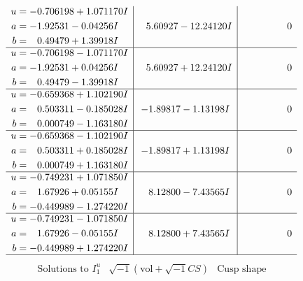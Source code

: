 \documentclass[1p]{elsarticle_modified}
\theoremstyle{definition}
\newcommand{\I}{\sqrt{-1}}
\begin{document}
$$\begin{array}{c|c|c}
\begin{aligned}
u &= -0.706198 + 1.071170 I \\
a &= -1.92531 - 0.04256 I \\
b &= \phantom{-}0.49479 + 1.39918 I\end{aligned}
 & \phantom{-}5.60927 - 12.24120 I & \phantom{-0.000000 } 0 \\ \hline\begin{aligned}
u &= -0.706198 - 1.071170 I \\
a &= -1.92531 + 0.04256 I \\
b &= \phantom{-}0.49479 - 1.39918 I\end{aligned}
 & \phantom{-}5.60927 + 12.24120 I & \phantom{-0.000000 } 0 \\ \hline\begin{aligned}
u &= -0.659368 + 1.102190 I \\
a &= \phantom{-}0.503311 - 0.185028 I \\
b &= \phantom{-}0.000749 - 1.163180 I\end{aligned}
 & -1.89817 - 1.13198 I & \phantom{-0.000000 } 0 \\ \hline\begin{aligned}
u &= -0.659368 - 1.102190 I \\
a &= \phantom{-}0.503311 + 0.185028 I \\
b &= \phantom{-}0.000749 + 1.163180 I\end{aligned}
 & -1.89817 + 1.13198 I & \phantom{-0.000000 } 0 \\ \hline\begin{aligned}
u &= -0.749231 + 1.071850 I \\
a &= \phantom{-}1.67926 + 0.05155 I \\
b &= -0.449989 - 1.274220 I\end{aligned}
 & \phantom{-}8.12800 - 7.43565 I & \phantom{-0.000000 } 0 \\ \hline\begin{aligned}
u &= -0.749231 - 1.071850 I \\
a &= \phantom{-}1.67926 - 0.05155 I \\
b &= -0.449989 + 1.274220 I\end{aligned}
 & \phantom{-}8.12800 + 7.43565 I & \phantom{-0.000000 } 0\\
 \hline 
 \end{array}$$\newpage$$\begin{array}{c|c|c}  
\text{Solutions to }I^u_{1}& \I (\text{vol} + \sqrt{-1}CS) & \text{Cusp shape}\\
 \hline 
\begin{aligned}

\end{aligned}
\end{array}$$
\end{document}
